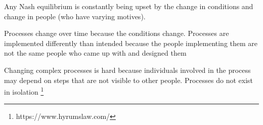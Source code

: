 Any Nash equilibrium is constantly being upset by the change in conditions and change in people (who have varying motives).


Processes change over time because the conditions change. Processes are implemented differently than intended because the people implementing them are not the same people who came up with and designed them


Changing complex processes is hard because individuals involved in the process may depend on steps that are not visible to other people.
Processes do not exist in isolation
\footnote{https://www.hyrumslaw.com/} %
